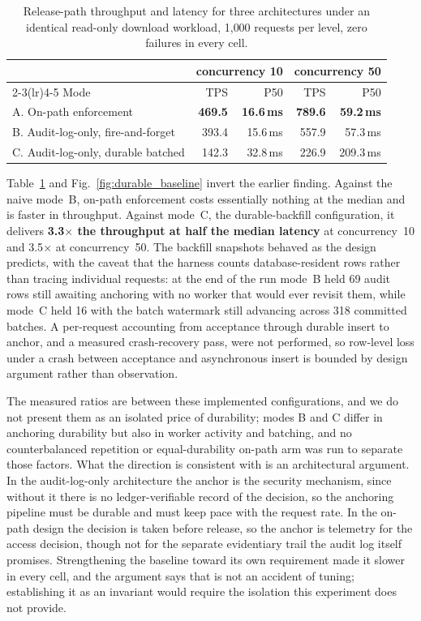 \documentclass[preprint,12pt]{elsarticle}
\begin{document}
\begin{table}[!t]
\centering
\caption{Release-path throughput and latency for three architectures under
an identical read-only download workload, 1{,}000 requests per level, zero
failures in every cell.}
\label{tab:durable_baseline}
\footnotesize
\setlength{\tabcolsep}{5pt}
\begin{tabular}{@{}lrrrr@{}}
\toprule
& \multicolumn{2}{c}{concurrency 10} & \multicolumn{2}{c}{concurrency 50} \\
\cmidrule(lr){2-3}\cmidrule(lr){4-5}
Mode & TPS & P50 & TPS & P50 \\
\midrule
A. On-path enforcement                 & \textbf{469.5} & \textbf{16.6\,ms} & \textbf{789.6} & \textbf{59.2\,ms} \\
B. Audit-log-only, fire-and-forget     & 393.4 & 15.6\,ms & 557.9 & 57.3\,ms \\
C. Audit-log-only, durable batched     & 142.3 & 32.8\,ms & 226.9 & 209.3\,ms \\
\bottomrule
\end{tabular}
\end{table}

Table~\ref{tab:durable_baseline} and Fig.~\ref{fig:durable_baseline} invert
the earlier finding. Against the naive mode~B, on-path enforcement costs
essentially nothing at the median and is faster in throughput. Against
mode~C, the durable-backfill configuration, it delivers \textbf{3.3$\times$
the throughput at half the median latency} at concurrency~10 and 3.5$\times$
at concurrency~50. The backfill snapshots behaved as the design predicts, with the caveat
that the harness counts database-resident rows rather than tracing individual
requests: at the end of the run mode~B held 69 audit rows still awaiting
anchoring with no worker that would ever revisit them, while mode~C held 16
with the batch watermark still advancing across 318 committed batches. A
per-request accounting from acceptance through durable insert to anchor, and
a measured crash-recovery pass, were not performed, so row-level loss under a
crash between acceptance and asynchronous insert is bounded by design
argument rather than observation.

The measured ratios are between these implemented configurations, and we do
not present them as an isolated price of durability; modes B and C differ in
anchoring durability but also in worker activity and batching, and no
counterbalanced repetition or equal-durability on-path arm was run to separate
those factors. What the direction is consistent with is an architectural
argument. In the audit-log-only architecture the anchor is the security
mechanism, since without it there is no ledger-verifiable record of the
decision, so the anchoring pipeline must be durable and must keep pace with
the request rate. In the on-path design the decision is taken before release,
so the anchor is telemetry for the access decision, though not for the
separate evidentiary trail the audit log itself promises. Strengthening the
baseline toward its own requirement made it slower in every cell, and the
argument says that is not an accident of tuning; establishing it as an
invariant would require the isolation this experiment does not provide.
\end{document}
